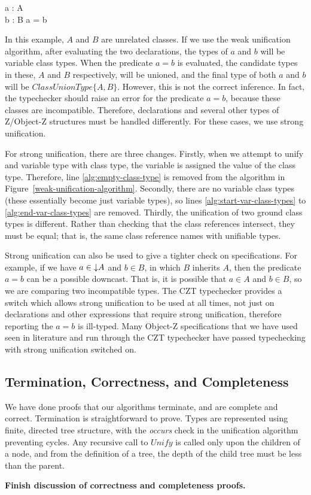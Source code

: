 \begin{axdef}
 a : A\\
 b : B
\where
 a = b
\end{axdef}

In this example, $A$ and $B$ are unrelated classes. If we use the weak
 unification algorithm, after evaluating the two declarations, the
 types of $a$ and $b$ will be variable class types. When the predicate
 $a=b$ is evaluated, the candidate types in these, $A$ and $B$
 respectively, will be unioned, and the final type of both $a$ and $b$
 will be $ClassUnionType \{A, B\}$. However, this is not the correct inference. In
 fact, the typechecker should raise an error for the predicate $a=b$,
 because these classes are incompatible. Therefore, declarations and
 several other types of Z/Object-Z structures must be handled
 differently. For these cases, we use strong unification.

 For strong unification, there are three changes. Firstly, when we
 attempt to unify and variable type with class type, the variable is
 assigned the value of the class type. Therefore, line
 \ref{alg:empty-class-type} is removed from the algorithm in
 Figure~\ref{weak-unification-algorithm}. Secondly, there are no
 variable class types (these essentially become just variable types),
 so lines \ref{alg:start-var-class-types} to
 \ref{alg:end-var-class-types} are removed. Thirdly, the unification
 of two ground class types is different. Rather than checking that the
 class references intersect, they must be equal; that is, the same
 class reference names with unifiable types.

 Strong unification can also be used to give a tighter check on
 specifications. For example, if we have $a \in \mathord\downarrow A$ and $b \in
 B$, in which $B$ inherits $A$, then the predicate $a=b$ can be a
 possible downcast. That is, it is possible that $a \in A$ and $b \in
 B$, so we are comparing two incompatible types. The CZT typechecker
 provides a switch which allows strong unification to be used at all
 times, not just on declarations and other expressions that require
 strong unification, therefore reporting the $a=b$ is ill-typed. Many
 Object-Z specifications that we have used seen in literature and run
 through the CZT typechecker have passed typechecking with strong
 unification switched on.

\subsection{Termination, Correctness, and Completeness}

We have done proofs that our algorithms terminate, and are complete
and correct. Termination is straightforward to prove. Types are
represented using finite, directed tree structure, with the {\em
occurs} check in the unification algorithm preventing cycles. Any
recursive call to $Unify$ is called only upon the children of a node,
and from the definition of a tree, the depth of the child tree must be
less than the parent.

{\bf Finish discussion of correctness and completeness proofs.}
